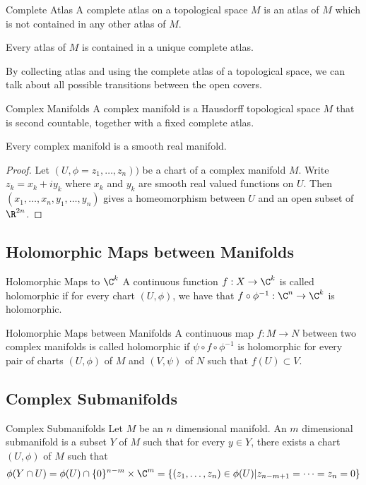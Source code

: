 \documentclass[a4paper]{article}
\begin{document}
\begin{defn}{Complete Atlas}{} A complete atlas on a topological space $M$ is an atlas of $M$ which is not contained in any other atlas of $M$. 
\end{defn}

\begin{lmm}{}{} Every atlas of $M$ is contained in a unique complete atlas. 
\end{lmm}

By collecting atlas and using the complete atlas of a topological space, we can talk about all possible transitions between the open covers. 

\begin{defn}{Complex Manifolds}{} A complex manifold is a Hausdorff topological space $M$ that is second countable, together with a fixed complete atlas. 
\end{defn}

\begin{prp}{}{} Every complex manifold is a smooth real manifold. \tcbline
\begin{proof}
Let $(U,\phi=z_1,\dots,z_n))$ be a chart of a complex manifold $M$. Write $z_k=x_k+iy_k$ where $x_k$ and $y_k$ are smooth real valued functions on $U$. Then $(x_1,\dots,x_n,y_1,\dots,y_n)$ gives a homeomorphism between $U$ and an open subset of $\R^{2n}$. 
\end{proof}
\end{prp}

\subsection{Holomorphic Maps between Manifolds}
\begin{defn}{Holomorphic Maps to $\C^k$}{} A continuous function $f:X\to\C^k$ is called holomorphic if for every chart $(U,\phi)$, we have that $f\circ\phi^{-1}:\C^n\to\C^k$ is holomorphic. 
\end{defn}

\begin{defn}{Holomorphic Maps between Manifolds}{} A continuous map $f:M\to N$ between two complex manifolds is called holomorphic if $\psi\circ f\circ\phi^{-1}$ is holomorphic for every pair of charts $(U,\phi)$ of $M$ and $(V,\psi)$ of $N$ such that $f(U)\subset V$. 
\end{defn}

\subsection{Complex Submanifolds}
\begin{defn}{Complex Submanifolds}{} Let $M$ be an $n$ dimensional manifold. An $m$ dimensional submanifold is a subset $Y$ of $M$ such that for every $y\in Y$, there exists a chart $(U,\phi)$ of $M$ such that $$\phi(Y\cap U)=\phi(U)\cap\{0\}^{n-m}\times\C^m=\{(z_1,\dots,z_n)\in\phi(U)|z_{n-m+1}=\dots=z_n=0\}$$
\end{defn}
\end{document}
